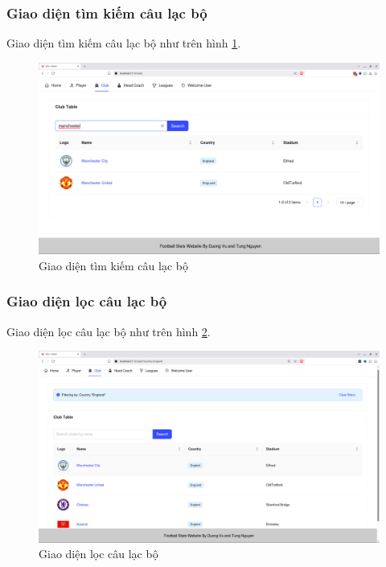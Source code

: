 \documentclass[../BTL.tex]{subfiles}
\begin{document}
\subsubsection{Giao diện tìm kiếm câu lạc bộ}
Giao diện tìm kiếm câu lạc bộ như trên hình \ref{fig:user-club-search}.
\begin{figure}
\centering
\includegraphics[width=1\linewidth]{Hinhve/user-club-search.png}
\caption{Giao diện tìm kiếm câu lạc bộ}
\label{fig:user-club-search}
\end{figure}

\subsubsection{Giao diện lọc câu lạc bộ}
Giao diện lọc câu lạc bộ như trên hình \ref{fig:user-club-filter}.
\begin{figure}
\centering
\includegraphics[width=1\linewidth]{Hinhve/user-club-filter.png}
\caption{Giao diện lọc câu lạc bộ}
\label{fig:user-club-filter}
\end{figure}
\end{document}
